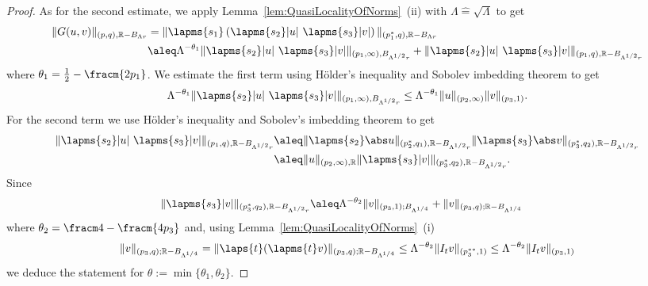 \begin{proof}
As for the second estimate, we apply Lemma~\ref{lem:QuasiLocalityOfNorms}~(ii)
with $\Lambda \hat = \sqrt{\Lambda}$ to get
\begin{align*}
 \|G(u,v)\|_{(p,q), \mathbb R - B_{\Lambda r}} 
 &=\|\lapms{s_1}\left( \lapms{s_2} |u| \ \lapms{s_3} |v| \right)\|_{(p_1^\ast,q),\mathbb R - B_{\Lambda r}}
 \\
 &\aleq \Lambda^{-\theta_1} 
 \|\lapms{s_2} |u| \ \lapms{s_3} |v|\|_{(p_1, \infty), B_{\Lambda^{1/2} r}}
    + \|\lapms{s_2} |u| \ \lapms{s_3} |v|\|_{(p_1,q), \mathbb R -B_{\Lambda^{1/2}r}}
\end{align*}
where $\theta_{1} = \frac 1 2 - \fracm{2p_1}$.
We estimate the first term using H\"older's inequality and Sobolev imbedding theorem to get
\begin{equation*}
 \Lambda^{-\theta_1} 
 \|\lapms{s_2} |u| \ \lapms{s_3} |v|\|_{(p_1, \infty), B_{\Lambda^{1/2} r}}
 \leq \Lambda^{-\theta_1}\|u\|_{(p_2,\infty)} \|v\|_{(p_3,1)}.
\end{equation*}
For the second term we use H\"older's inequality and Sobolev's imbedding theorem to get
\begin{align*} 
 \|\lapms{s_2} |u| \ \lapms{s_3} |v|\|_{(p_1, q), \mathbb R - B_{\Lambda^{1/2} r}}
 &\aleq \|\lapms{s_2}\abs u\|_{(p^\ast_2,q_1), \mathbb R - B_{\Lambda^{1/2}r}} 
 \|\lapms{s_3}\abs v\|_{(p^\ast_3,q_2), \mathbb R - B_{\Lambda^{1/2}r}} \\
 &\aleq \|u\|_{(p_2,\infty), \mathbb R } 
 \|\lapms{s_3}|v|\|_{(p^\ast_3,q_{2}), \mathbb R - B_{\Lambda^{1/2}r}}.
\end{align*}
Since
\begin{align*}
 \|\lapms{s_3} |v|\|_{(p^\ast_3, q_2), \mathbb R - B_{\Lambda^{1/2} r}}
 & \aleq \Lambda^{-\theta_2} \|v\|_{(p_3,1);B_{\Lambda^{1/4}}} + \|v\|_{(p_3,q);\mathbb R - B_{\Lambda^{1/4}}}
\end{align*}
where $\theta_2 =  \fracm 4 - \fracm {4p_3}$ and,
using Lemma~\ref{lem:QuasiLocalityOfNorms}~(i)
\begin{equation*}
\|v\|_{(p_3,q);\mathbb R - B_{\Lambda^{1/4}}}
= \|\laps{t} (\lapms{t}v)\|_{(p_3,q);\mathbb R - B_{\Lambda^{1/4}}}
\leq \Lambda^{-\theta_2} \|I_t v\|_{(p^{\ast \ast}_3,1)} 
\leq \Lambda^{-\theta_2} \|I_t v\|_{(p_3,1)}
\end{equation*}
we deduce the statement for $\theta := \min\{\theta_1, \theta_2\}$.
% 

\end{proof}
